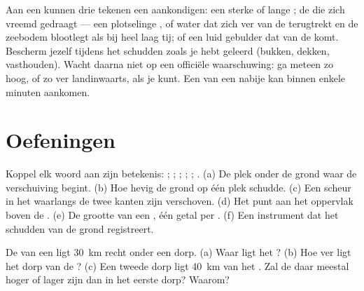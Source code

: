 \begin{remark}\label{rem:g7:earthquakes:natural-warning}
Aan een  kunnen drie tekenen een  aankondigen: een sterke of
lange ; de  die zich vreemd gedraagt --- een plotselinge
, of water dat zich ver van de  terugtrekt en de zeebodem
blootlegt als bij heel laag tij; of een luid gebulder dat van de 
komt. Bescherm jezelf tijdens het schudden zoals je hebt geleerd (bukken,
dekken, vasthouden). Wacht daarna niet op een officiële waarschuwing: ga
meteen zo hoog, of zo ver landinwaarts, als je kunt. Een  van een
nabije  kan binnen enkele minuten aankomen.
\end{remark}


\section{Oefeningen}

\begin{exercise}[$\star$]\label{exo:g7:earthquakes:1}
Koppel elk woord aan zijn betekenis: ; ; ; ;
; . (a) De plek onder de grond waar de verschuiving
begint. (b) Hoe hevig de grond op één plek schudde. (c) Een scheur in het
 waarlangs de twee kanten zijn verschoven. (d) Het punt aan het
oppervlak boven de . (e) De grootte van een , één getal per
. (f) Een instrument dat het schudden van de grond registreert.
\end{exercise}

\begin{exercise}[$\star$]\label{exo:g7:earthquakes:2}
De  van een  ligt \qty{30}{km} recht onder een dorp. (a)
Waar ligt het ? (b) Hoe ver ligt het dorp van de ? (c) Een
tweede dorp ligt \qty{40}{km} van het . Zal de  daar
meestal hoger of lager zijn dan in het eerste dorp? Waarom?
\end{exercise}

